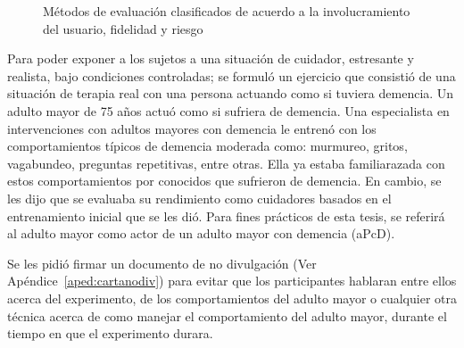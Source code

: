 \begin{figure}[h]
        \centering
	\caption{M\'etodos de evaluaci\'on clasificados de acuerdo a la involucramiento del usuario, fidelidad y riesgo \protect\citep{Castro11} }\label{fig:evalmethods}
\end{figure}


Para poder exponer a los sujetos a una situaci\'on de cuidador, estresante y realista, bajo condiciones controladas; se formul\'o un ejercicio que consisti\'o de una situaci\'on de terapia real con una persona actuando como si tuviera demencia. Un adulto mayor de 75 a\~nos actu\'o como si sufriera de demencia. Una especialista en intervenciones con adultos mayores con demencia le entren\'o con los comportamientos t\'ipicos de demencia moderada como: murmureo, gritos, vagabundeo, preguntas repetitivas, entre otras. Ella ya estaba familiarazada con estos comportamientos por conocidos que sufrieron de demencia. En cambio, se les dijo que se evaluaba su rendimiento como cuidadores basados en el entrenamiento inicial que se les di\'o. Para fines pr\'acticos de esta tesis, se referir\'a al adulto mayor como actor de un adulto mayor con demencia (aPcD).

Se les pidi\'o firmar un documento de no divulgaci\'on (Ver Ap\'endice~\ref{aped:cartanodiv}) para evitar que los participantes hablaran entre ellos acerca del experimento, de los comportamientos del adulto mayor o cualquier otra t\'ecnica acerca de como manejar el comportamiento del adulto mayor, durante el tiempo en que el experimento durara.

